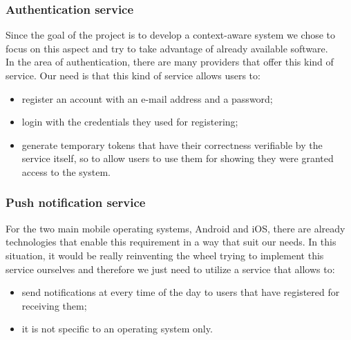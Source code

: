 \documentclass[../../main]{subfiles}
\begin{document}
\subsubsection{Authentication service}
Since the goal of the project is to develop a context-aware system we chose to focus on this aspect and try to take advantage of already available software.\\
In the area of authentication, there are many providers that offer this kind of service. Our need is that this kind of service allows users to:
\begin{itemize}
    \item register an account with an e-mail address and a password;
    \item login with the credentials they used for registering;
    \item generate temporary tokens that have their correctness verifiable by the service itself, so to allow users to use them for showing they were granted access to the system.
\end{itemize}

\subsubsection{Push notification service}
For the two main mobile operating systems, Android and iOS, there are already technologies that enable this requirement in a way that suit our needs.
In this situation, it would be really reinventing the wheel trying to implement this service ourselves and therefore we just need to utilize a service that allows to:
\begin{itemize}
    \item send notifications at every time of the day to users that have registered for receiving them;
    \item it is not specific to an operating system only.
\end{itemize}
\end{document}
